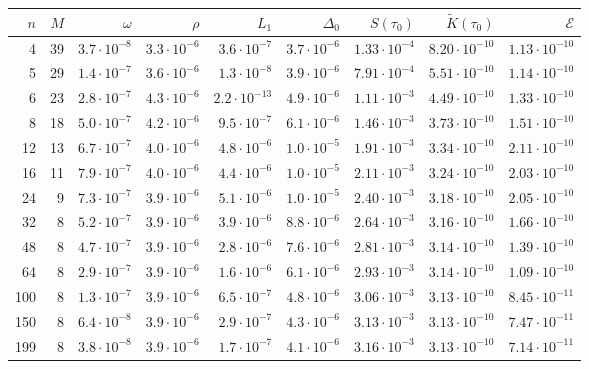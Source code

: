 \begin{tabular}{rrrrrrrrr}
\toprule
\(n\) & \(M\) & \(\omega\) & \(\rho\) & \(L_1\) & \(\Delta_0\) & \(S(\tau_0)\) & \(\tilde K(\tau_0)\) & \(\mathcal E\)\\
\midrule
4 & 39 & \(3.7\cdot10^{-8}\) & \(3.3\cdot10^{-6}\) & \(3.6\cdot10^{-7}\) & \(3.7\cdot10^{-6}\) & \(1.33\cdot10^{-4}\) & \(8.20\cdot10^{-10}\) & \(1.13\cdot10^{-10}\)\\
5 & 29 & \(1.4\cdot10^{-7}\) & \(3.6\cdot10^{-6}\) & \(1.3\cdot10^{-8}\) & \(3.9\cdot10^{-6}\) & \(7.91\cdot10^{-4}\) & \(5.51\cdot10^{-10}\) & \(1.14\cdot10^{-10}\)\\
6 & 23 & \(2.8\cdot10^{-7}\) & \(4.3\cdot10^{-6}\) & \(2.2\cdot10^{-13}\) & \(4.9\cdot10^{-6}\) & \(1.11\cdot10^{-3}\) & \(4.49\cdot10^{-10}\) & \(1.33\cdot10^{-10}\)\\
8 & 18 & \(5.0\cdot10^{-7}\) & \(4.2\cdot10^{-6}\) & \(9.5\cdot10^{-7}\) & \(6.1\cdot10^{-6}\) & \(1.46\cdot10^{-3}\) & \(3.73\cdot10^{-10}\) & \(1.51\cdot10^{-10}\)\\
12 & 13 & \(6.7\cdot10^{-7}\) & \(4.0\cdot10^{-6}\) & \(4.8\cdot10^{-6}\) & \(1.0\cdot10^{-5}\) & \(1.91\cdot10^{-3}\) & \(3.34\cdot10^{-10}\) & \(2.11\cdot10^{-10}\)\\
16 & 11 & \(7.9\cdot10^{-7}\) & \(4.0\cdot10^{-6}\) & \(4.4\cdot10^{-6}\) & \(1.0\cdot10^{-5}\) & \(2.11\cdot10^{-3}\) & \(3.24\cdot10^{-10}\) & \(2.03\cdot10^{-10}\)\\
24 & 9 & \(7.3\cdot10^{-7}\) & \(3.9\cdot10^{-6}\) & \(5.1\cdot10^{-6}\) & \(1.0\cdot10^{-5}\) & \(2.40\cdot10^{-3}\) & \(3.18\cdot10^{-10}\) & \(2.05\cdot10^{-10}\)\\
32 & 8 & \(5.2\cdot10^{-7}\) & \(3.9\cdot10^{-6}\) & \(3.9\cdot10^{-6}\) & \(8.8\cdot10^{-6}\) & \(2.64\cdot10^{-3}\) & \(3.16\cdot10^{-10}\) & \(1.66\cdot10^{-10}\)\\
48 & 8 & \(4.7\cdot10^{-7}\) & \(3.9\cdot10^{-6}\) & \(2.8\cdot10^{-6}\) & \(7.6\cdot10^{-6}\) & \(2.81\cdot10^{-3}\) & \(3.14\cdot10^{-10}\) & \(1.39\cdot10^{-10}\)\\
64 & 8 & \(2.9\cdot10^{-7}\) & \(3.9\cdot10^{-6}\) & \(1.6\cdot10^{-6}\) & \(6.1\cdot10^{-6}\) & \(2.93\cdot10^{-3}\) & \(3.14\cdot10^{-10}\) & \(1.09\cdot10^{-10}\)\\
100 & 8 & \(1.3\cdot10^{-7}\) & \(3.9\cdot10^{-6}\) & \(6.5\cdot10^{-7}\) & \(4.8\cdot10^{-6}\) & \(3.06\cdot10^{-3}\) & \(3.13\cdot10^{-10}\) & \(8.45\cdot10^{-11}\)\\
150 & 8 & \(6.4\cdot10^{-8}\) & \(3.9\cdot10^{-6}\) & \(2.9\cdot10^{-7}\) & \(4.3\cdot10^{-6}\) & \(3.13\cdot10^{-3}\) & \(3.13\cdot10^{-10}\) & \(7.47\cdot10^{-11}\)\\
199 & 8 & \(3.8\cdot10^{-8}\) & \(3.9\cdot10^{-6}\) & \(1.7\cdot10^{-7}\) & \(4.1\cdot10^{-6}\) & \(3.16\cdot10^{-3}\) & \(3.13\cdot10^{-10}\) & \(7.14\cdot10^{-11}\)\\
\bottomrule
\end{tabular}
